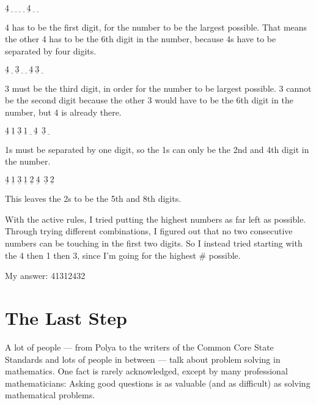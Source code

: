 \begin{sol*}[Solution 8]\ 

$\underline{4} \ \underline{\ } \ \underline{\ } \ \underline{\ }\  \underline{\ }\  \underline{4} \ \underline{\ } \ \underline{\ }$

4 has to be the first digit, for the number to be the largest possible.  That means the other 4 has to be the 6th digit in the number, because 4s have to be separated by four digits.




$\underline{4} \ \underline{\ } \ \underline{3} \ \underline{\ }\  \underline{\ } \ \underline{4}  \ \underline{3 } \ \underline{\ }$

3 must be the third digit, in order for the number to be largest possible.  3 cannot be the second digit because the other 3 would have to be the 6th digit in the number, but 4 is already there.




$\underline{4} \ \underline{1} \ \underline{3} \ \underline{1 }\  \underline{\ } \  \underline{4}\   \ \underline{3 } \ \underline{\ }$

1s must be separated by one digit, so the 1s can only be the 2nd and 4th digit in the number.


$\underline{4} \ \underline{1} \ \underline{3} \ \underline{1 }\  \underline{2} \  \underline{4}\   \ \underline{3 } \ \underline{2 }$

This leaves the 2s to be the 5th and 8th digits.


\end{sol*}


\begin{sol*}[Solution 9]

With the active rules, I tried putting the highest numbers as far left as possible.  Through trying different combinations, I figured out that no two consecutive numbers can be touching in the first two digits.  So I instead tried starting with the 4 then 1 then 3, since I'm going for the highest \# possible.



My answer: 41312432


\end{sol*}


\section{The Last Step}
A lot of people --- from Polya to the writers of the Common Core State Standards and lots of people in between --- talk about problem solving in mathematics.  One fact is rarely acknowledged, except by many professional mathematicians: Asking good questions is as valuable (and as difficult) as solving mathematical problems.  

